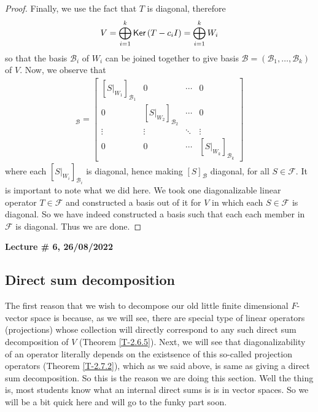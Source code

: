 \documentclass[letterpaper,11pt,twoside]{article}
\theoremstyle{definition}
\theoremstyle{definition}
\theoremstyle{definition}
\theoremstyle{definition}
\theoremstyle{definition}
\theoremstyle{definition}
\theoremstyle{remark}
\theoremstyle{definition}
\newcommand{\Ker}[1]{{\fontfamily{lmss}\selectfont 
		\text{Ker}\left (#1\right )
}}
\newcommand{\rest}[2]{\left. { #1 }\right \vert_{#2}}
\newcommand{\newlecture}[2]{\begin{center}
    \textbf{Lecture \# #1, #2}
\end{center}}
\begin{document}
\begin{proof}
    Finally, we use the fact that $T$ is diagonal, therefore 
    \begin{align*}
        V = \bigoplus_{i=1}^k \Ker{T-c_iI} = \bigoplus_{i=1}^kW_i
    \end{align*}
    so that the basis $\mathcal{B}_i$ of $W_i$ can be joined together to give basis $\mathcal{B} = ( \mathcal{B}_1,\dots,\mathcal{B}_k)$ of $V$. Now, we observe that
    \begin{align*}
        [S]_\mathcal{B} = \begin{bmatrix}
        [\rest{S}{W_1}]_{ \mathcal{B}_1}&0&\cdots &0\\
        0&[\rest{S}{W_2}]_{ \mathcal{B}_2}&\cdots &0\\
        \vdots &\vdots &\ddots &\vdots\\
        0&0&\cdots &[\rest{S}{W_k}]_{ \mathcal{B}_k}
        \end{bmatrix}
    \end{align*}
    where each $[\rest{S}{W_i}]_{ \mathcal{B}_i}$ is diagonal, hence making $[S]_\mathcal{B}$ diagonal, for all $S\in \mathcal{F}$. It is important to note what we did here. We took one diagonalizable linear operator $T\in \mathcal{F}$ and constructed a basis out of it for $V$ in which each $S\in  \mathcal{F}$ is diagonal. So we have indeed constructed a basis such that each each member in $ \mathcal{F} $ is diagonal. Thus we are done.
    \end{proof}
    \newlecture{6}{26/08/2022}
    \subsection{Direct sum decomposition}
    The first reason that we wish to decompose our old little finite dimensional $F$-vector space is because, as we will see, there are special type of linear operators (projections) whose collection will directly correspond to any such direct sum decomposition of $V$ (Theorem \ref{T-2.6.5}). Next, we will see that diagonalizability of an operator literally depends on the existsence of this so-called projection operators (Theorem \ref{T-2.7.2}), which as we said above, is same as giving a direct sum decomposition. So this is the reason we are doing this section. Well the thing is, most students know what an internal direct sums is is in vector spaces. So we will be a bit quick here and will go to the funky part soon.\\
    
\end{document}
